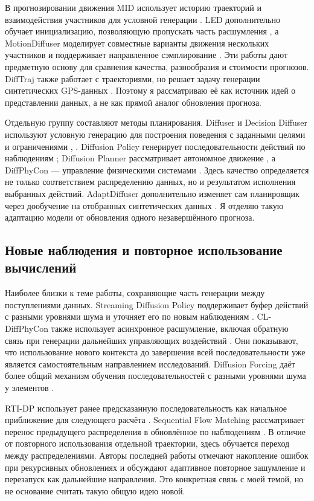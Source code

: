 \documentclass{article}
\begin{document}
В прогнозировании движения MID использует историю траекторий и взаимодействия участников для условной генерации \citep{p09}. LED дополнительно обучает инициализацию, позволяющую пропускать часть расшумления \citep{p10}, а MotionDiffuser моделирует совместные варианты движения нескольких участников и поддерживает направленное сэмплирование \citep{p11}. Эти работы дают предметную основу для сравнения качества, разнообразия и стоимости прогнозов. DiffTraj также работает с траекториями, но решает задачу генерации синтетических GPS-данных \citep{p12}. Поэтому я рассматриваю её как источник идей о представлении данных, а не как прямой аналог обновления прогноза.

Отдельную группу составляют методы планирования. Diffuser и Decision Diffuser используют условную генерацию для построения поведения с заданными целями и ограничениями \citep{p14}, \citep{p15}. Diffusion Policy генерирует последовательности действий по наблюдениям \citep{p17}; Diffusion Planner рассматривает автономное движение \citep{p13}, а DiffPhyCon — управление физическими системами \citep{p18}. Здесь качество определяется не только соответствием распределению данных, но и результатом исполнения выбранных действий. AdaptDiffuser дополнительно изменяет сам планировщик через дообучение на отобранных синтетических данных \citep{p16}. Я отделяю такую адаптацию модели от обновления одного незавершённого прогноза.

\subsection{Новые наблюдения и повторное использование вычислений}

Наиболее близки к теме работы, сохраняющие часть генерации между поступлениями данных. Streaming Diffusion Policy поддерживает буфер действий с разными уровнями шума и уточняет его по новым наблюдениям \citep{p01}. CL-DiffPhyCon также использует асинхронное расшумление, включая обратную связь при генерации дальнейших управляющих воздействий \citep{p02}. Они показывают, что использование нового контекста до завершения всей последовательности уже является самостоятельным направлением исследований. Diffusion Forcing даёт более общий механизм обучения последовательностей с разными уровнями шума у элементов \citep{p05}.

RTI-DP использует ранее предсказанную последовательность как начальное приближение для следующего расчёта \citep{p04}. Sequential Flow Matching рассматривает перенос предыдущего распределения в обновлённое по наблюдениям \citep{p03}. В отличие от повторного использования отдельной траектории, здесь обучается переход между распределениями. Авторы последней работы отмечают накопление ошибок при рекурсивных обновлениях и обсуждают адаптивное повторное зашумление и перезапуск как дальнейшие направления. Это конкретная связь с моей темой, но не основание считать такую общую идею новой.
\end{document}
